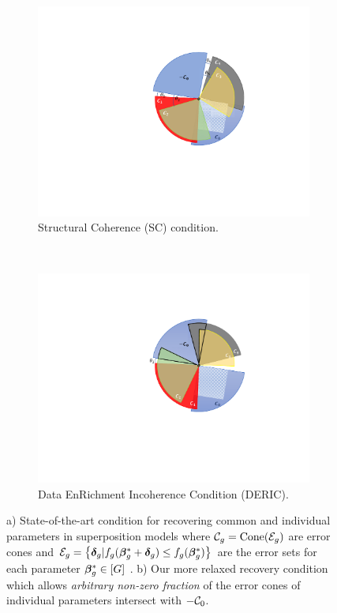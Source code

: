 \begin{figure}[t!]
	\centering
	\begin{subfigure}[t]{0.44\textwidth}
		\includegraphics[width=\textwidth]{./img/sc.pdf}
		\caption{Structural Coherence (SC) condition.}\label{fig:sc}
	\end{subfigure} 
	~
	\begin{subfigure}[t]{0.43\textwidth}
		\includegraphics[width=\textwidth]{./img/deric.pdf}
		\caption{Data EnRichment Incoherence Condition (DERIC).}
		\label{fig:deric}
	\end{subfigure}
	\squeezeup
	\caption{a) State-of-the-art condition for recovering common and individual parameters in superposition models where $\cC_g = \text{Cone}(\cE_g)$ are error cones and $\cE_g = \left\{\ddelta_g | f_g(\bbeta _g^* + \ddelta_g) \leq f_g(\bbeta _g^*)\right\}$ are the error sets for each parameter $\boldsymbol{\beta}^*_g \in [G]$ \cite{guba16}. b) Our more relaxed recovery condition which allows \emph{arbitrary non-zero fraction } of the error cones of individual parameters intersect with $-\cC_0$.}
	\label{fig syn2}
\end{figure}

